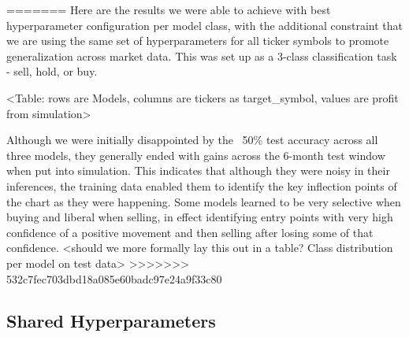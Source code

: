 \documentclass[10pt,twocolumn,letterpaper]{article}
\begin{document}
\begin{table}
\begin{center}
\end{center}
\caption{Time in seconds of each models' Average Epoch, Training, and Validation performance}
\label{tab:metrics}
\end{table}
=======
Here are the results we were able to achieve with best hyperparameter configuration per model class, with the additional constraint that we are using the same set of hyperparameters for all ticker symbols to promote generalization across market data. This was set up as a 3-class classification task - sell, hold, or buy.

<Table: rows are Models, columns are tickers as target\_symbol, values are profit from simulation>

Although we were initially disappointed by the ~50\% test accuracy across all three models, they generally ended with gains across the 6-month test window when put into simulation. This indicates that although they were noisy in their inferences, the training data enabled them to identify the key inflection points of the chart as they were happening. Some models learned to be very selective when buying and liberal when selling, in effect identifying entry points with very high confidence of a positive movement and then selling after losing some of that confidence.  <should we more formally lay this out in a table? Class distribution per model on test data>
>>>>>>> 532c7fec703dbd18a085e60badc97e24a9f33c80

\subsection{Shared Hyperparameters}
\end{document}
